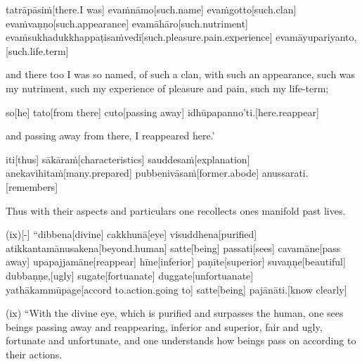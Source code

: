 \begin{samepage}
\begingl[glneveryline={\PaliGlossA,\PaliGlossB}]
tatrāpāsiṁ[there.I was] evaṁnāmo[such.name] evaṁgotto[such.clan] evaṁvaṇṇo[such.appearance] evamāhāro[such.nutriment] evaṁsukhadukkhappaṭisaṁvedī[such.pleasure.pain.experience] evamāyupariyanto,[such.life.term]
\endgl
\nopagebreak
\linespread{0.5}
\begin{spacin}{0.2}
{\PaliGlossFT and there too I was so named, of such a clan, with such an appearance, such was my nutriment, such my experience of pleasure and pain, such my life-term;}
\end{spacin}
\vskip 12pt
\end{samepage}
\begin{samepage}
\begingl[glneveryline={\PaliGlossA,\PaliGlossB}]
so[he] tato[from there] cuto[passing away] idhūpapanno’ti.[here.reappear]
\endgl
\nopagebreak
\linespread{0.5}
\begin{spacin}{0.2}
{\PaliGlossFT and passing away from there, I reappeared here.’}
\end{spacin}
\vskip 12pt
\end{samepage}
\begin{samepage}
\begingl[glneveryline={\PaliGlossA,\PaliGlossB}]
iti[thus] sākāraṁ[characteristics] sauddesaṁ[explanation] anekavihitaṁ[many.prepared] pubbenivāsaṁ[former.abode] anussarati.[remembers]
\endgl
\nopagebreak
\linespread{0.5}
\begin{spacin}{0.2}
{\PaliGlossFT Thus with their aspects and particulars one recollects ones manifold past lives.}
\end{spacin}
\vskip 12pt
\end{samepage}
\begin{samepage}
\begingl[glneveryline={\PaliGlossA,\PaliGlossB}]
(ix)[-] “dibbena[divine] cakkhunā[eye] visuddhena[purified] atikkantamānusakena[beyond.human] satte[being] passati[sees] cavamāne[pass away] upapajjamāne[reappear] hīne[inferior] paṇīte[superior] suvaṇṇe[beautiful] dubbaṇṇe,[ugly] sugate[fortuanate] duggate[unfortuanate] yathākammūpage[accord to.action.going to] satte[being] pajānāti.[know clearly]
\endgl
\nopagebreak
\linespread{0.5}
\begin{spacin}{0.2}
{\PaliGlossFT (ix) “With the divine eye, which is purified and surpasses the human, one sees beings passing away and reappearing, inferior and superior, fair and ugly, fortunate and unfortunate, and one understands how beings pass on according to their actions.}
\end{spacin}
\vskip 12pt
\end{samepage}
